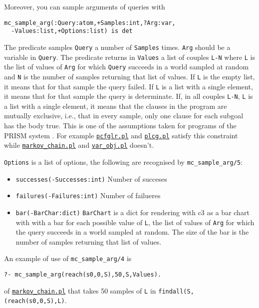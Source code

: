 Moreover, you can sample arguments of queries with
\begin{verbatim}
mc_sample_arg(:Query:atom,+Samples:int,?Arg:var,
  -Values:list,+Options:list) is det
\end{verbatim}
The predicate samples \verb|Query| a number of \verb|Samples| times.
\verb|Arg| should be a variable in \verb|Query|.
The predicate returns in \verb|Values| a list of couples \verb|L-N| where
\verb|L| is the list of values of \verb|Arg| for which \verb|Query|
succeeds in a world sampled at random and \verb|N|
is the number of samples returning that list of values.
If \verb|L| is the empty list, it means that for that
sample the query failed.
If \verb|L| is a list with a
single element, it means that for that sample the query is
determinate.
If, in all couples \verb|L-N|, \verb|L|
is a list with a
single element, it means that the clauses in the program
are mutually exclusive, i.e., that in every sample, only
one clause for each subgoal has the body true. This is one
of the assumptions taken for programs of the PRISM system \cite{DBLP:journals/jair/SatoK01}.
For example
\href{http://cplint.eu/e/pcfglr.pl}{\texttt{pcfglr.pl}} and \href{http://cplint.eu/e/plcg.pl}{\texttt{plcg.pl}} satisfy this constraint while
 \href{http://cplint.eu/e/markov_chain.pl}{\texttt{markov\_chain.pl}} and \href{http://cplint.eu/e/var_obj.pl}{\texttt{var\_obj.pl}} doesn't.

\verb|Options| is a list of options, the following are recognised by \verb|mc_sample_arg/5|:
\begin{itemize}
\item \verb|successes(-Successes:int)|
Number of succeses
\item \verb|failures(-Failures:int)|
Number of failueres
\item \verb|bar(-BarChar:dict)|
\verb|BarChart| is a dict for rendering with c3 as a bar chart with
 with a bar for each possible value of \verb|L|, the list of values of 
 \verb|Arg| for which the query succeeds in a world sampled at random. 
 The size of the bar is the number of samples
returning that list of values.
\end{itemize}


An example of use of \verb|mc_sample_arg/4| is
\begin{verbatim}
?- mc_sample_arg(reach(s0,0,S),50,S,Values).
\end{verbatim}
of \href{http://cplint.eu/e/markov_chain.pl}{\texttt{markov\_chain.pl}}
that takes 50 samples of \verb|L| in \verb|findall(S,(reach(s0,0,S),L)|.

